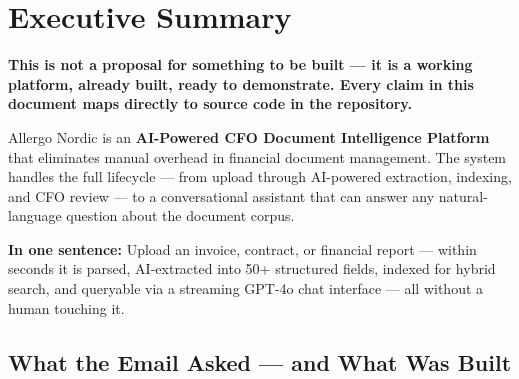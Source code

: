 \documentclass[12pt,a4paper]{article}
\newcommand{\keypoint}[1]{%
  \begin{tcolorbox}[colback=HighlightYellow, colframe=NordicGold,
    boxrule=1.2pt, arc=4pt, left=8pt, right=8pt, top=5pt, bottom=5pt]
    \faExclamationCircle\hspace{6pt}\textbf{#1}
  \end{tcolorbox}
}
\begin{document}
\tableofcontents
\newpage

\section{Executive Summary}

\keypoint{This is not a proposal for something to be built — it is a working platform, already built, ready to demonstrate. Every claim in this document maps directly to source code in the repository.}

Allergo Nordic is an \textbf{AI-Powered CFO Document Intelligence Platform} that eliminates manual overhead in financial document management. The system handles the full lifecycle — from upload through AI-powered extraction, indexing, and CFO review — to a conversational assistant that can answer any natural-language question about the document corpus.

\vspace{0.5em}
\begin{tcolorbox}[colback=LightBg, colframe=NordicBlue, boxrule=1pt, arc=4pt]
\textbf{In one sentence:} Upload an invoice, contract, or financial report — within seconds it is parsed, AI-extracted into 50+ structured fields, indexed for hybrid search, and queryable via a streaming GPT-4o chat interface — all without a human touching it.
\end{tcolorbox}

\vspace{0.5em}
\subsection*{What the Email Asked — and What Was Built}
\end{document}
